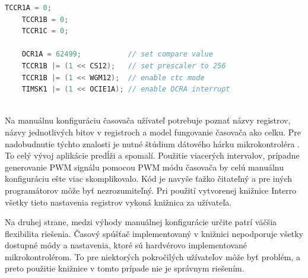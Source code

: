 \begin{lstlisting}[language=c++]      
    TCCR1A = 0;
    TCCR1B = 0;
    TCCR1C = 0;

    OCR1A = 62499;           // set compare value
    TCCR1B |= (1 << CS12);   // set prescaler to 256
    TCCR1B |= (1 << WGM12);  // enable ctc mode
    TIMSK1 |= (1 << OCIE1A); // enable OCRA interrupt
    
\end{lstlisting}

Na manuálnu konfiguráciu časovača užívateľ potrebuje poznať názvy registrov, názvy jednotlivých bitov  v registroch a model fungovanie časovača ako celku. Pre nadobudnutie
týchto znalosti je nutné štúdium dátového hárku mikrokontroléra \cite{atmelATmega64012801281}. To celý vývoj aplikácie predĺži a spomalí. Použitie viacerých intervalov,
prípadne generovanie  PWM signálu pomocou PWM módu časovača by celú
manuálnu konfiguráciu ešte viac skomplikovalo. Kód je navyše ťažko čitateľný a pre iných programátorov
môže byť nezrozumiteľný. Pri použití vytvorenej knižnice Interro všetky tieto nastavenia registrov vykoná knižnica za užívateľa. \par
Na druhej strane, medzi výhody manuálnej konfigurácie určite patrí väčšia flexibilita riešenia. Časový spúšťač implementovaný v knižnici nepodporuje všetky dostupné
módy a nastavenia, ktoré sú hardvérovo implementované mikrokontrolérom. To pre niektorých pokročilých užívateľov môže byť problém, a preto použitie knižnice
v tomto prípade nie je správnym riešením.

